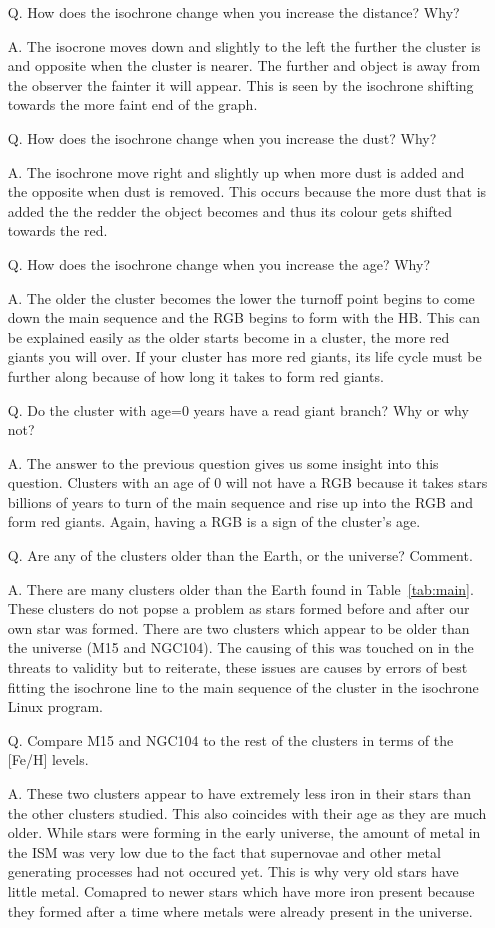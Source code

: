 \documentclass{article}
\begin{document}
\begin{enumerate}

\item[Q.] How does the isochrone change when you increase the distance? Why?
\item[A.] The isocrone moves down and slightly to the left the further the cluster is
and opposite when the cluster is nearer. The further and object is away from the observer
the fainter it will appear. This is seen by the isochrone shifting towards the more faint
end of the graph.
\item[Q.] How does the isochrone change when you increase the dust? Why?
\item[A.] The isochrone move right and slightly up when more dust is added and the 
opposite when dust is removed. This occurs because the more dust that is added the
the redder the object becomes and thus its colour gets shifted towards the red.
\item[Q.] How does the isochrone change when you increase the age? Why?
\item[A.] The older the cluster becomes the lower the turnoff point begins to come
down the main sequence and the RGB begins to form with the HB. This can be explained
easily as the older starts become in a cluster, the more red giants you will over.
If your cluster has more red giants, its life cycle must be further along because
of how long it takes to form red giants.
\item[Q.] Do the cluster with age=0 years have a read giant branch? Why or why not?
\item[A.] The answer to the previous question gives us some insight into this question.
Clusters with an age of 0 will not have a RGB because it takes stars billions of
years to turn of the main sequence and rise up into the RGB and form red giants.
Again, having a RGB is a sign of the cluster's age.
\item[Q.] Are any of the clusters older than the Earth, or the universe? Comment.
\item[A.] There are many clusters older than the Earth found in Table~\ref{tab:main}.
These clusters do not popse a problem as stars formed before and after our own 
star was formed. There are two clusters which appear to be older than the universe
(M15 and NGC104). The causing of this was touched on in the threats to validity
but to reiterate, these issues are causes by errors of best fitting the isochrone
line to the main sequence of the cluster in the isochrone Linux program.
\item[Q.] Compare M15 and NGC104 to the rest of the clusters in terms of the [Fe/H] levels. 
\item[A.] These two clusters appear to have extremely less iron in their stars than
the other clusters studied. This also coincides with their age as they are much older.
While stars were forming in the early universe, the amount of metal in the ISM
was very low due to the fact that supernovae and other metal generating processes
had not occured yet. This is why very old stars have little metal. Comapred to newer
stars which have more iron present because they formed after a time where metals
were already present in the universe.


\end{enumerate}
\end{document}
